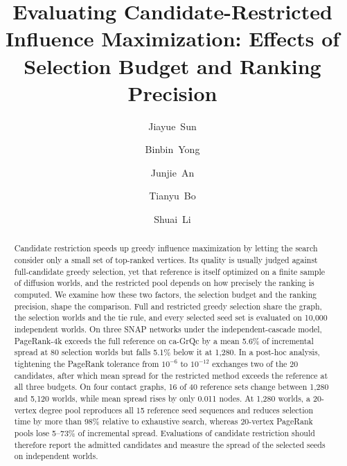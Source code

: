 \documentclass[smallextended]{svjour3}
\begin{document}
\title{Evaluating Candidate-Restricted Influence Maximization: Effects of Selection Budget and Ranking Precision}
\author{\mbox{Jiayue Sun} \and \mbox{Binbin Yong} \and \mbox{Junjie An} \and \mbox{Tianyu Bo} \and \mbox{Shuai Li}}
\date{}
\maketitle
\begin{abstract}
Candidate restriction speeds up greedy influence maximization by letting the search consider only a small set of top-ranked vertices. Its quality is usually judged against full-candidate greedy selection, yet that reference is itself optimized on a finite sample of diffusion worlds, and the restricted pool depends on how precisely the ranking is computed. We examine how these two factors, the selection budget and the ranking precision, shape the comparison. Full and restricted greedy selection share the graph, the selection worlds and the tie rule, and every selected seed set is evaluated on 10,000 independent worlds. On three SNAP networks under the independent-cascade model, PageRank-4k exceeds the full reference on ca-GrQc by a mean 5.6\% of incremental spread at 80 selection worlds but falls 5.1\% below it at 1,280. In a post-hoc analysis, tightening the PageRank tolerance from $10^{-6}$ to $10^{-12}$ exchanges two of the 20 candidates, after which mean spread for the restricted method exceeds the reference at all three budgets. On four contact graphs, 16 of 40 reference sets change between 1,280 and 5,120 worlds, while mean spread rises by only 0.011 nodes. At 1,280 worlds, a 20-vertex degree pool reproduces all 15 reference seed sequences and reduces selection time by more than 98\% relative to exhaustive search, whereas 20-vertex PageRank pools lose 5--73\% of incremental spread. Evaluations of candidate restriction should therefore report the admitted candidates and measure the spread of the selected seeds on independent worlds.
\end{abstract}
\end{document}
